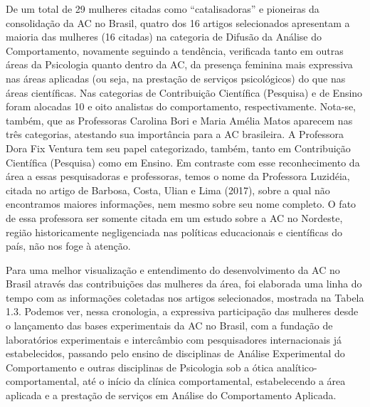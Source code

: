 De um total de 29 mulheres citadas como ``catalisadoras'' e pioneiras da consolidação da AC no Brasil, quatro dos 16 artigos selecionados apresentam a maioria das mulheres (16 citadas) na categoria de Difusão da Análise do Comportamento, novamente seguindo a tendência, verificada tanto em outras áreas da Psicologia quanto dentro da AC, da presença feminina mais expressiva nas áreas aplicadas (ou seja, na prestação de serviços psicológicos) do que nas áreas científicas. Nas categorias de Contribuição Científica (Pesquisa) e de Ensino foram alocadas 10 e oito analistas do comportamento, respectivamente. Nota-se, também, que as Professoras Carolina Bori e Maria Amélia Matos aparecem nas três categorias, atestando sua importância para a AC brasileira. A Professora Dora Fix Ventura tem seu papel categorizado, também, tanto em Contribuição Científica (Pesquisa) como em Ensino. Em contraste com esse reconhecimento da área a essas pesquisadoras e professoras, temos o nome da Professora Luzidéia, citada no artigo de Barbosa, Costa, Ulian e Lima (2017), sobre a qual não encontramos maiores informações, nem mesmo sobre seu nome completo. O fato de essa professora ser somente citada em um estudo sobre a AC no Nordeste, região historicamente negligenciada nas políticas educacionais e científicas do país, não nos foge à atenção.

Para uma melhor visualização e entendimento do desenvolvimento da AC no Brasil através das contribuições das mulheres da área, foi elaborada uma linha do tempo com as informações coletadas nos artigos selecionados, mostrada na Tabela 1.3. Podemos ver, nessa cronologia, a expressiva participação das mulheres desde o lançamento das bases experimentais da AC no Brasil, com a fundação de laboratórios experimentais e intercâmbio com pesquisadores internacionais já estabelecidos, passando pelo ensino de disciplinas de Análise Experimental do Comportamento e outras disciplinas de Psicologia sob a ótica analítico-comportamental, até o início da clínica comportamental, estabelecendo a área aplicada e a prestação de serviços em Análise do Comportamento Aplicada.
\vfill
\pagebreak

